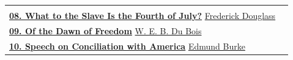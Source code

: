 \begin{tabularx}{\textwidth}{@{}X r@{}}
& \hyperref[article-07]{\pageref{article-07}}\\[6pt]
\hyperref[article-08]{\textbf{08. What to the Slave Is the Fourth of July?}}\newline
{\small\color{headgrey}\hyperref[article-08]{Frederick Douglass}}
& \hyperref[article-08]{\pageref{article-08}}\\[6pt]
\hyperref[article-09]{\textbf{09. Of the Dawn of Freedom}}\newline
{\small\color{headgrey}\hyperref[article-09]{W. E. B. Du Bois}}
& \hyperref[article-09]{\pageref{article-09}}\\[6pt]
\hyperref[article-10]{\textbf{10. Speech on Conciliation with America}}\newline
{\small\color{headgrey}\hyperref[article-10]{Edmund Burke}}
& \hyperref[article-10]{\pageref{article-10}}\\[6pt]
\end{tabularx}
\endgroup
\vfill
{}
